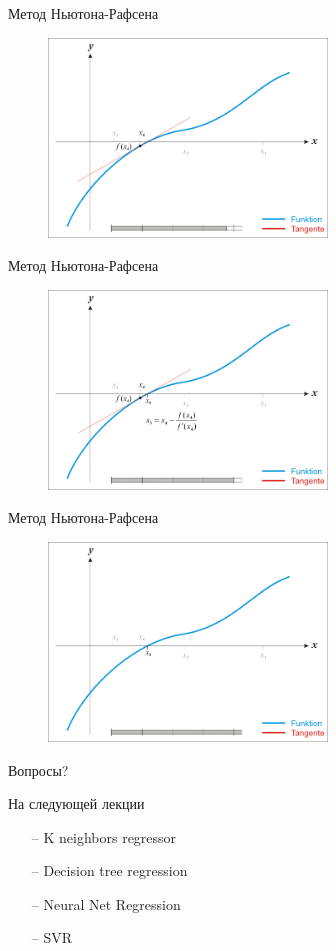 \documentclass[10pt]{beamer}
\begin{document}
\begin{frame}{Метод Ньютона-Рафсена}
	\begin{figure}[htbp]
	  \includegraphics[height=150pt, keepaspectratio = true]{images/newton-15}   
	\end{figure}
\end{frame}

\begin{frame}{Метод Ньютона-Рафсена}
	\begin{figure}[htbp]
	  \includegraphics[height=150pt, keepaspectratio = true]{images/newton-16}   
	\end{figure}
\end{frame}

\begin{frame}{Метод Ньютона-Рафсена}
	\begin{figure}[htbp]
	  \includegraphics[height=150pt, keepaspectratio = true]{images/newton-17}   
	\end{figure}
\end{frame}

\begin{frame}[standout]
  Вопросы?
\end{frame}

\appendix

\begin{frame}{На следующей лекции}
	\begin{itemize}
    	\item[--] K neighbors regressor
    	\item[--] Decision tree regression
    	\item[--] Neural Net Regression
    	\item[--] SVR
	\end{itemize}
\end{frame}
\end{document}
